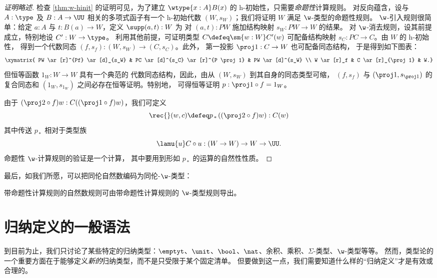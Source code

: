 \begin{proof}[证明略述]
检查 \cref{thm:w-hinit} 的证明可见，为了建立 $\wtype{x:A}B(x)$ 的 h-初始性，只需要\emph{命题性}计算规则。
对反向蕴含，设与
$A : \type$ 及 $B : A \to \UU$ 相关的多项式函子有一个 h-初始代数 $(W,s_W)$；我们将证明 $W$ 满足 $\w$-类型的命题性规则。
$\w$-引入规则很简单：给定 $a : A$ 与 $t : B(a) \rightarrow W$，定义 $\supp(a,t) : W$ 为
对 $(a,t) : PW$ 施加结构映射 $s_W : PW \rightarrow W$ 的结果。
对 $\w$-消去规则，设其前提成立，特别地设 $C' : W \to \type$。
利用其他前提，可证明类型 $C \defeq \sm{ w : W} C'(w)$
可配备结构映射 $s_C : PC \rightarrow C$。由 $W$ 的 h-初始性，
得到一个代数同态 $(f, s_f) : (W, s_W) \rightarrow (C, s_C)$。此外，
第一投影 $\proj1 : C \rightarrow W$ 也可配备同态结构，
于是得到如下图表：
\[
\xymatrix{
PW \ar[r]^{Pf} \ar[d]_{s_W}  & PC \ar[d]^{s_C}  \ar[r]^{P \proj1}  & PW  \ar[d]^{s_W}  \\
W \ar[r]_f  & C \ar[r]_{\proj1}  & W.}
\]
但恒等函数 $1_W : W \rightarrow W$ 具有一个典范的
代数同态结构，因此，由从 $(W,s_W)$ 到其自身的同态类型可缩，
$(f,s_f)$ 与 $(\proj1, s_{\proj1})$ 的复合同态和 $(1_W, s_{1_W})$ 之间必存在恒等证明。特别地，
可得恒等证明 $p :  \proj1 \circ f = 1_W$。

由于 $(\proj2 \circ f) w : C( (\proj1 \circ f) w)$，我们可定义
\[
\rec{}(w,c) \defeq
p_{\, * \,}( ( \proj2 \circ  f)   w )   : C(w)
\]
其中传送 $p_{\, * \,}$ 相对于类型族
\[
\lamu{u}C\circ u : (W\to W)\to W\to \UU.
\]
命题性 $\w$-计算规则的验证是一个计算，
其中要用到形如 $p_{\, * \,}$ 的运算的自然性性质。
\end{proof}

%
最后，如我们所愿，可以把同伦自然数编码为同伦-$\w$-类型：

\begin{thm}
带命题性计算规则的自然数规则可由带命题性计算规则的 $\w$-类型规则导出。
\end{thm}

\section{归纳定义的一般语法}
\label{sec:strictly-positive}

%
%

到目前为止，我们只讨论了某些特定的归纳类型：$\emptyt$、$\unit$、$\bool$、$\nat$、余积、乘积、$\Sigma$-类型、$\w$-类型等等。
然而，类型论的一个重要方面在于能够定义\emph{新的}归纳类型，而不是只受限于某个固定清单。
但要做到这一点，我们需要知道什么样的“归纳定义”才是有效或合理的。

